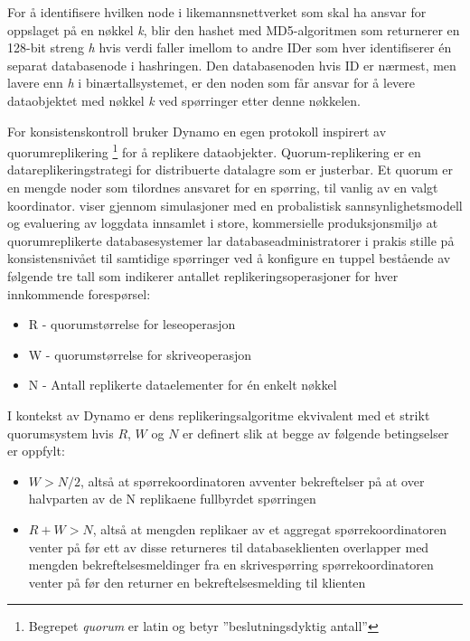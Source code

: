 For å identifisere hvilken node i likemannsnettverket som skal ha ansvar for oppslaget på en nøkkel \emph{k}, blir den hashet med MD5-algoritmen som returnerer en 128-bit streng \emph{h} hvis verdi faller imellom to andre IDer som hver identifiserer én separat databasenode i hashringen. Den databasenoden hvis ID er nærmest, men lavere enn \emph{h} i binærtallsystemet, er den noden som får ansvar for å levere dataobjektet med nøkkel \emph{k} ved spørringer etter denne nøkkelen.

For konsistenskontroll bruker Dynamo en egen protokoll inspirert av quorumreplikering \footnote{Begrepet \emph{quorum} er latin og betyr ''beslutningsdyktig antall''} for å replikere dataobjekter. Quorum-replikering er en datareplikeringstrategi for distribuerte datalagre som er justerbar. Et quorum er en mengde noder som tilordnes ansvaret for en spørring, til vanlig av en valgt koordinator. \cite{bailis2014} viser gjennom simulasjoner med en probalistisk sannsynlighetsmodell og evaluering av loggdata innsamlet i store, kommersielle produksjonsmiljø at quorumreplikerte databasesystemer lar databaseadministratorer i prakis stille på konsistensnivået til samtidige spørringer ved å konfigure en tuppel bestående av følgende tre tall som indikerer antallet replikeringsoperasjoner for hver innkommende forespørsel:

\begin{itemize}
  \item R - quorumstørrelse for leseoperasjon
  \item W - quorumstørrelse for skriveoperasjon
  \item N - Antall replikerte dataelementer for én enkelt nøkkel
\end{itemize}

I kontekst av Dynamo er dens replikeringsalgoritme ekvivalent med et strikt quorumsystem hvis \(R\), \(W\) og \(N\) er definert slik at begge av følgende betingselser er oppfylt:

\begin{itemize} \label{strictquorum}
  \item \(W > N/2\), altså at spørrekoordinatoren avventer bekreftelser på at over halvparten av de N replikaene fullbyrdet spørringen
  \item \(R + W > N\), altså at mengden replikaer av et aggregat spørrekoordinatoren venter på før ett av disse returneres til databaseklienten overlapper med mengden bekreftelsesmeldinger fra en skrivespørring spørrekoordinatoren venter på før den returner en bekreftelsesmelding til klienten
\end{itemize}


